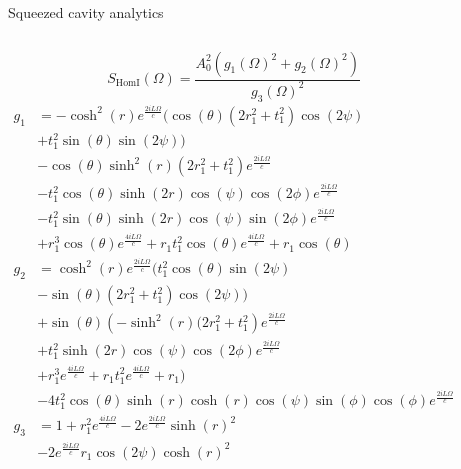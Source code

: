 \documentclass[12pt]{beamer}
\begin{document}
\begin{frame}{Squeezed cavity analytics}
\begin{columns}
$$S_\mathrm{HomI}(\Omega) = \frac{A_0^2 \left( g_1(\Omega)^2 + g_2(\Omega)^2 \right)}{g_3(\Omega)^2}$$
\tiny
\begin{align*}
g_1 &= -\cosh ^2(r) e^{\frac{2 i L \Omega }{c}} (\cos (\theta ) \left(2 r_1^2+t_1^2\right) \cos (2 \psi )\\
    &+t_1^2 \sin (\theta ) \sin (2 \psi )) \\
    &-\cos (\theta ) \sinh ^2(r) \left(2 r_1^2+t_1^2\right) e^{\frac{2 i L \Omega
    }{c}}\\
    &-t_1^2 \cos (\theta ) \sinh (2 r) \cos (\psi ) \cos (2 \phi ) e^{\frac{2 i L \Omega }{c}}\\
    &-t_1^2 \sin (\theta )
    \sinh (2 r) \cos (\psi ) \sin (2 \phi ) e^{\frac{2 i L \Omega }{c}}\\
    &+r_1^3 \cos (\theta ) e^{\frac{4 i L \Omega
    }{c}}+r_1 t_1^2 \cos (\theta ) e^{\frac{4 i L \Omega }{c}}+r_1 \cos (\theta ) \\
g_2 &= \cosh ^2(r) e^{\frac{2 i L \Omega }{c}} (t_1^2 \cos (\theta ) \sin (2 \psi )\\
    &-\sin (\theta ) \left(2 r_1^2+t_1^2\right) \cos (2 \psi ))\\
    &+\sin (\theta ) \left(-\sinh ^2(r) (2 r_1^2+t_1^2\right)
    e^{\frac{2 i L \Omega }{c}}\\
    &+t_1^2 \sinh (2 r) \cos (\psi ) \cos (2 \phi ) e^{\frac{2 i L \Omega }{c}}\\
    &+r_1^3 e^{\frac{4 i L \Omega }{c}}+r_1 t_1^2 e^{\frac{4 i L \Omega }{c}}+r_1)\\
    &-4 t_1^2 \cos (\theta ) \sinh (r) \cosh (r) \cos (\psi ) \sin (\phi ) \cos (\phi ) e^{\frac{2 i L \Omega }{c}} \\
g_3 &= 1 + r_1^2 e^{\frac{4 i L \Omega}{c}} - 2 e^{\frac{2 i L \Omega}{c}} \sinh(r)^2 \\
    &- 2 e^{\frac{2 i L \Omega}{c}} r_1 \cos(2 \psi) \cosh(r)^2 
\end{align*}
\normalsize
\end{columns}
\end{frame}
\end{document}
